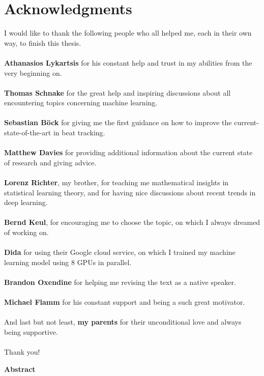 \documentclass{scrartcl}
\begin{document}
\section*{Acknowledgments}
I would like to thank the following people who all helped me, each in their own way, to finish this thesis.
\\ \\
\textbf{Athanasios Lykartsis} for his constant help and trust in my abilities from the very beginning on.
\\ \\
\textbf{Thomas Schnake} for the great help and inspiring discussions about all encountering topics concerning machine learning. 
\\ \\
\textbf{Sebastian Böck} for giving me the first guidance on how to improve the current-state-of-the-art in beat tracking.
\\ \\
\textbf{Matthew Davies} for providing additional information about the current state of research and giving advice.
\\ \\
\textbf{Lorenz Richter}, my brother, for teaching me mathematical insights in statistical learning theory, and for having nice discussions about recent trends in deep learning. 
\\ \\
\textbf{Bernd Keul}, for encouraging me to choose the topic, on which I always dreamed of working on. 
\\ \\
\textbf{Dida} for using their Google cloud service, on which I trained my machine learning model using 8 GPUs in parallel.
\\ \\
\textbf{Brandon Oxendine} for helping me revising the text as a native speaker. 
\\ \\
\textbf{Michael Flamm} for his constant support and being a such great motivator.  
\\ \\
And last but not least, \textbf{my parents} for their unconditional love and always being supportive. 
\\ \\
Thank you!

\newpage 
\begin{center} 
\textsf{\textbf{Abstract}}
\end{center}
\end{document}
